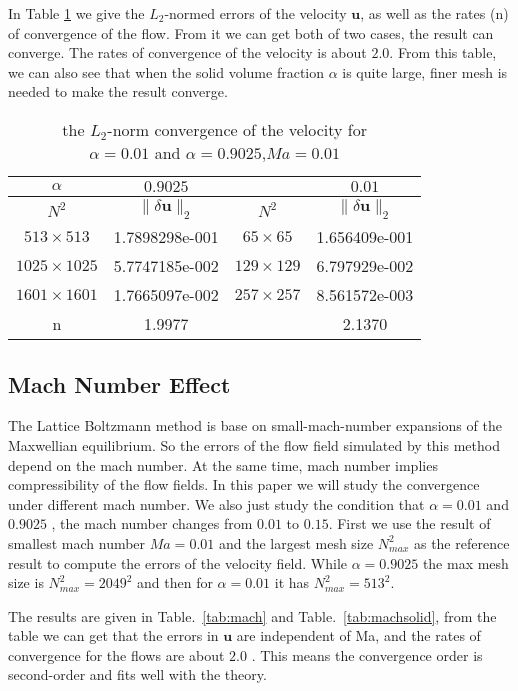 \documentclass{article}
\begin{document}
In Table \ref{tab:tableconv} we give the $L_2$-normed errors of the velocity $\bm u$, as well as the
rates (n) of convergence of the flow. From it we can get both of two cases, the result can converge. The rates of convergence of the velocity
is about $2.0$. From this table, we can also see that when the solid volume fraction $\alpha$ is quite large, finer mesh is needed to make the
result converge.

\begin{table}[!h]
\centering
\caption{the $L_2$-norm convergence of the velocity for  \protect\\ $\alpha=0.01$ and $\alpha=0.9025$,$Ma=0.01$}
\label{tab:tableconv}
\begin{tabular}{cccc}
\hline
 $\alpha$& $0.9025$       &   & $0.01$ \\
 \hline
 $N^2$  & $\|\delta \bm{u}\|_2$&$N^2$ & $\|\delta \bm{u}\|_2$ \\
 \hline
 $513\times513$    & 1.7898298e-001 &$65\times65$   & 1.656409e-001\\
 $1025\times1025$  & 5.7747185e-002 &$129\times129$ & 6.797929e-002\\
 $1601\times1601$  & 1.7665097e-002 &$257\times257$ & 8.561572e-003\\
\hline
 n    & 1.9977            & &   2.1370\\
\hline
\end{tabular}

\end{table}
\subsection{Mach Number Effect}
The Lattice Boltzmann method is base on small-mach-number expansions of the Maxwellian equilibrium. So the errors of the flow field simulated by this method
depend on the mach number. At the same time, mach number implies compressibility of the flow fields. In this paper we will study the convergence under different
mach number. We also just study the condition that $\alpha = 0.01$ and $0.9025$ , the mach number changes from $0.01$ to $0.15$.  First we use the result of smallest mach number $Ma=0.01$ and the largest mesh size $N^2_{max}$ as the reference result to compute the errors of the velocity field. While
$\alpha = 0.9025$ the max mesh size is $N^2_{max}=2049^2$ and then for $\alpha  =0.01$ it has $N^2_{max}=513^2$.

The results are given in Table.~\ref{tab:mach} and Table.~\ref{tab:machsolid}, from the table we can get that the errors in $\bm u$ are independent of Ma, and the rates of convergence for the flows are about $2.0$ . This means the convergence order is second-order and fits well with the theory.
\end{document}
